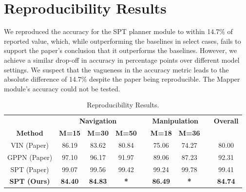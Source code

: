 \section{Reproducibility Results}
\label{sec:repo results}
We reproduced the accuracy for the SPT planner module to within 14.7\% of reported value, which, while outperforming the baselines \cite{lee2018gated} \cite{tamar2016value} in select cases, fails to support the paper's conclusion that it outperforms the baselines. However, we achieve a similar drop-off in accuracy in percentage points over different model settings. We suspect that the vagueness in the accuracy metric leads to the absolute difference of 14.7\% despite the paper being reproducible. The Mapper module's accuracy could not be tested.
\begin{table}
\begin{center}
\begin{tabular}{@{}ccccccccc@{}}

                                  & \multicolumn{3}{c}{\textbf{Navigation}} &  & \multicolumn{2}{c}{\textbf{Manipulation}} &  & \textbf{Overall} \\ 
\textbf{Method}                            & \textbf{M=15}     & \textbf{M=30}     & \textbf{M=50}     &  & \textbf{M=18}            & \textbf{M=36}           &  &         \\ 
\multicolumn{1}{c|}{VIN (Paper)}  & 86.19    & 83.62    & 80.84    &  & 75.06           & 74.27          &  & 80.00   \\
\multicolumn{1}{c|}{GPPN (Paper)} & 97.10    & 96.17    & 91.97    &  & 89.06           & 87.23          &  & 92.31   \\
\multicolumn{1}{c|}{SPT (Paper)}  & 99.07    & 99.56    & 99.42    &  & 99.24           & 99.78          &  & 99.41   \\
\multicolumn{1}{c|}{\textbf{SPT (Ours)}}   & \textbf{84.40}    & \textbf{84.83}    &\textbf{ *  }      &  & \textbf{86.49}           & \textbf{*}              &  & \textbf{84.74}        \\ 
\end{tabular}
\end{center}
\caption{Reproducibility Results.}
\end{table}

